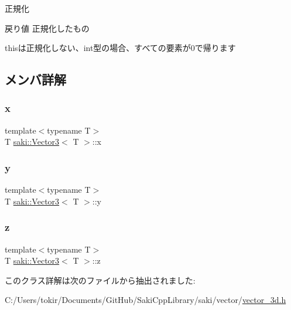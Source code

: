 正規化 

\begin{DoxyReturn}{戻り値}
正規化したもの
\end{DoxyReturn}
thisは正規化しない、int型の場合、すべての要素が0で帰ります 

\subsection{メンバ詳解}
\mbox{\label{classsaki_1_1_vector3_a1fa58e9e75dbeb650afb3db740f3131c}} 
\subsubsection{\texorpdfstring{x}{x}}
{\footnotesize\ttfamily template$<$typename T$>$ \\
T \mbox{\hyperlink{classsaki_1_1_vector3}{saki\+::\+Vector3}}$<$ T $>$\+::x}

\mbox{\label{classsaki_1_1_vector3_aba41be4543769bd023387691acf654dd}} 
\subsubsection{\texorpdfstring{y}{y}}
{\footnotesize\ttfamily template$<$typename T$>$ \\
T \mbox{\hyperlink{classsaki_1_1_vector3}{saki\+::\+Vector3}}$<$ T $>$\+::y}

\mbox{\label{classsaki_1_1_vector3_abb4ddf92f66d05e965fbd17ab3e655ff}} 
\subsubsection{\texorpdfstring{z}{z}}
{\footnotesize\ttfamily template$<$typename T$>$ \\
T \mbox{\hyperlink{classsaki_1_1_vector3}{saki\+::\+Vector3}}$<$ T $>$\+::z}



このクラス詳解は次のファイルから抽出されました\+:\begin{DoxyCompactItemize}
\item 
C\+:/\+Users/tokir/\+Documents/\+Git\+Hub/\+Saki\+Cpp\+Library/saki/vector/\mbox{\hyperlink{vector__3d_8h}{vector\+\_\+3d.\+h}}\end{DoxyCompactItemize}
